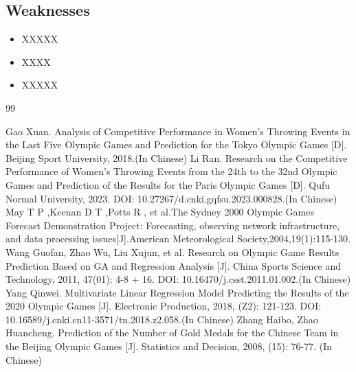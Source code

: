 \documentclass{mcmthesis}
\begin{document}
\subsection{Weaknesses}

\begin{itemize}
\item XXXXX

\item XXXX

\item XXXXX
\end{itemize}

\newpage

\begin{thebibliography}{99}

 Gao Xuan. Analysis of Competitive Performance in Women's Throwing Events in the Last Five Olympic Games and Prediction for the Tokyo Olympic Games [D]. Beijing Sport University, 2018.(In Chinese) 
 Li Ran. Research on the Competitive Performance of Women's Throwing Events from the 24th to the 32nd Olympic Games and Prediction of the Results for the Paris Olympic Games [D]. Qufu Normal University, 2023. DOI: 10.27267/d.cnki.gqfsu.2023.000828.(In Chinese) 
 May T P ,Keenan D T ,Potts R , et al.The Sydney 2000 Olympic Games Forecast Demonstration Project: Forecasting, observing network infrastructure, and data processing issues[J].American Meteorological Society,2004,19(1):115-130.
 Wang Guofan, Zhao Wu, Liu Xujun, et al. Research on Olympic Game Results Prediction Based on GA and Regression Analysis [J]. China Sports Science and Technology, 2011, 47(01): 4-8 + 16. DOI: 10.16470/j.csst.2011.01.002.(In Chinese) 
 Yang Qinwei. Multivariate Linear Regression Model Predicting the Results of the 2020 Olympic Games [J]. Electronic Production, 2018, (Z2): 121-123. DOI: 10.16589/j.cnki.cn11-3571/tn.2018.z2.058.(In Chinese)
 Zhang Haibo, Zhao Huancheng. Prediction of the Number of Gold Medals for the Chinese Team in the Beijing Olympic Games [J]. Statistics and Decision, 2008, (15): 76-77. (In Chinese)

\end{thebibliography}
\end{document}
